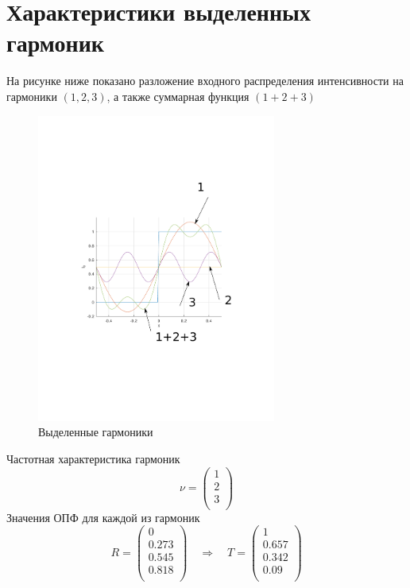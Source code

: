 \documentclass[14pt,a4paper]{extarticle}
\begin{document}
\section{Характеристики выделенных гармоник}
На рисунке ниже показано разложение входного распределения интенсивности на гармоники $(1, 2, 3)$, а также суммарная функция $(1+2+3)$
	\begin{figure}[H]
		\begin{center}
		\includegraphics[trim=110 150 110 150,clip, width=0.7\textwidth]{fig1-4e.pdf}\caption{Выделенные гармоники}\label{do}
	\end{center}
	\end{figure}

Частотная характеристика гармоник
\begin{equation}
	\nu=
	\begin{pmatrix}
		1\\
		2\\
		3\\
	\end{pmatrix}
\end{equation}
Значения ОПФ для каждой из гармоник
\begin{equation}
	R = 
	\begin{pmatrix}
		0\\
		0.273\\
		0.545\\
		0.818\\
	\end{pmatrix}\quad\Rightarrow\quad
	T = 
	\begin{pmatrix}
		1\\
		0.657\\
		0.342\\
		0.09\\
	\end{pmatrix}
\end{equation}
\end{document}
